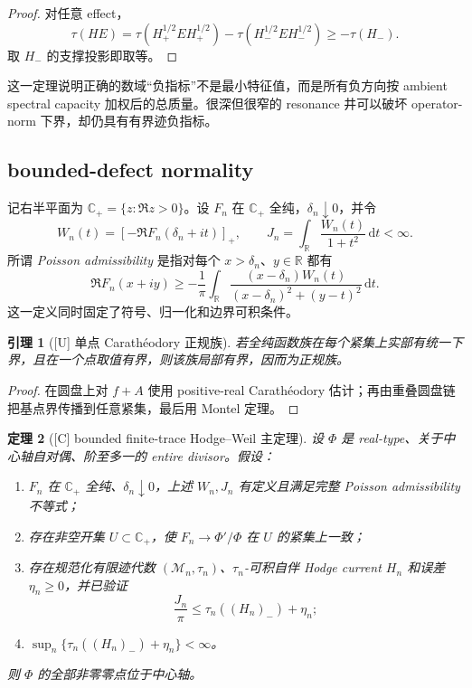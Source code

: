 \documentclass[UTF8,11pt,a4paper]{ctexart}
\newtheorem{theorem}{定理}[section]
\newtheorem{lemma}[theorem]{引理}
\theoremstyle{definition}
\theoremstyle{remark}
\newcommand{\C}{\mathbb C}
\newcommand{\R}{\mathbb R}
\newcommand{\dd}{\,\mathrm d}
\newcommand{\1}{\mathbf 1}
\newcommand{\cM}{\mathcal M}
\newcommand{\statusU}{\textnormal{[U]}}
\newcommand{\statusC}{\textnormal{[C]}}
\begin{document}
\begin{proof}
对任意 effect，
\[
 \tau(HE)=\tau(H_+^{1/2}EH_+^{1/2})-
 \tau(H_-^{1/2}EH_-^{1/2})\geq-\tau(H_-).
\]
取 $H_-$ 的支撑投影即取等。
\end{proof}

这一定理说明正确的数域“负指标”不是最小特征值，而是所有负方向按 ambient spectral capacity 加权后的总质量。很深但很窄的 resonance 井可以破坏 operator-norm 下界，却仍具有有界迹负指标。

\subsection{bounded-defect normality}

记右半平面为 $\C_+=\{z:\Re z>0\}$。设 $F_n$ 在 $\C_+$ 全纯，$\delta_n\downarrow0$，并令
\[
 W_n(t)=[-\Re F_n(\delta_n+it)]_+,
 \qquad
 J_n=\int_\R\frac{W_n(t)}{1+t^2}\dd t<\infty.
\]
所谓 \emph{Poisson admissibility} 是指对每个 $x>\delta_n$、$y\in\R$ 都有
\[
 \Re F_n(x+iy)\geq-\frac1\pi\int_\R
 \frac{(x-\delta_n)W_n(t)}{(x-\delta_n)^2+(y-t)^2}\dd t.
\]
这一定义同时固定了符号、归一化和边界可积条件。

\begin{lemma}[\statusU{} 单点 Carath\'eodory 正规族]
若全纯函数族在每个紧集上实部有统一下界，且在一个点取值有界，则该族局部有界，因而为正规族。
\end{lemma}

\begin{proof}
在圆盘上对 $f+A$ 使用 positive-real Carath\'eodory 估计；再由重叠圆盘链把基点界传播到任意紧集，最后用 Montel 定理。
\end{proof}

\begin{theorem}[\statusC{} bounded finite-trace Hodge--Weil 主定理]\label{thm:main}
设 $\Phi$ 是 real-type、关于中心轴自对偶、阶至多一的 entire divisor。假设：
\begin{enumerate}
 \item $F_n$ 在 $\C_+$ 全纯、$\delta_n\downarrow0$，上述 $W_n,J_n$ 有定义且满足完整 Poisson admissibility 不等式；
 \item 存在非空开集 $U\subset\C_+$，使 $F_n\to\Phi'/\Phi$ 在 $U$ 的紧集上一致；
 \item 存在规范化有限迹代数 $(\cM_n,\tau_n)$、$\tau_n$-可积自伴 Hodge current $H_n$ 和误差 $\eta_n\geq0$，并已验证
 \[
   \frac{J_n}{\pi}\leq\tau_n((H_n)_-)+\eta_n;
 \]
 \item $\sup_n\{\tau_n((H_n)_-)+\eta_n\}<\infty$。
\end{enumerate}
则 $\Phi$ 的全部非零零点位于中心轴。
\end{theorem}
\end{document}

